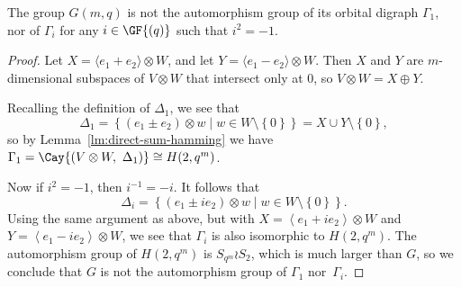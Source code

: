 \begin{lemma} \label{lm:Gamma_1,i}
The group $G{\left(m, q \right)}$ is not the automorphism group of its orbital digraph $\Gamma_1$, nor of $\Gamma_i$ for any $i \in \GF{\left(q \right)}$ such that $i^2 = -1$.
\end{lemma}
\begin{proof}
Let $X = \langle e_1 + e_2 \rangle \otimes W$, and let $Y = \langle e_1 - e_2 \rangle \otimes W$. Then $X$ and $Y$ are $m$-dimensional subspaces of $V \otimes W$ that intersect only at $0$, so $V \otimes W = X \oplus Y$.

Recalling the definition of $\Delta_1$, we see that
\begin{displaymath}
\Delta_1 = \left\{ \left(e_1 \pm e_2 \right) \otimes w \mid w \in W \setminus \left\{0 \right\} \right\} = X \cup Y \setminus {\left\{0 \right\}},
\end{displaymath}
so by Lemma~\ref{lm:direct-sum-hamming} we have $\Gamma_1 = \Cay{\left(V \otimes W,\ \Delta_1 \right)} \cong H{\left(2, q^m \right)}$.

Now if $i^2 = -1$, then $i^{-1} = -i$. It follows that
\begin{displaymath}
\Delta_i = {\left\{\left(e_1 \pm i e_2 \right) \otimes w \mid w \in W \setminus \left\{0 \right\}\right\}}.
\end{displaymath}
Using the same argument as above, but with $X = \left<e_1 + i e_2 \right> \otimes W$ and $Y = \left<e_1 - i e_2 \right> \otimes W$, we see that $\Gamma_i$ is also isomorphic to $H{\left(2, q^m \right)}$. The automorphism group of $H{\left(2, q^m \right)}$ is $S_{q^m} \wr S_2$, which is much larger than $G$, so we conclude that $G$ is not the automorphism group of $\Gamma_1$ nor~$\Gamma_i$.
\end{proof}

